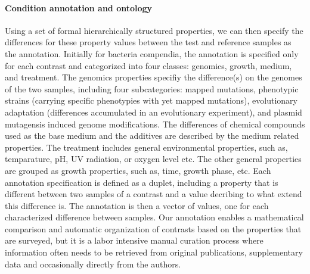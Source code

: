 \paragraph{Condition annotation and ontology}

Using a set of formal hierarchically structured properties, we can then
specify the differences for these property values between the test and
reference samples as the annotation.
%
Initially for bacteria compendia, the annotation is specified only for each
contrast and categorized into four classes: genomics, growth, medium, and
treatment.
%
The genomics properties specifiy the difference(s) on the genomes of the two
samples, including four subcategories: mapped mutations, phenotypic strains
(carrying specific phenotypies with yet mapped mutations), evolutionary
adaptation (differences accumulated in an evolutionary experiment), and plasmid
mutagensis induced genome modifications.
%
The differences of chemical compounds used as the base medium and the additives
are described by the medium related properties.
%
The treatment includes general environmental properties, such as, temparature,
pH, UV radiation, or oxygen level etc.
%
The other general properties are grouped as growth properties, such as, time,
growth phase, etc.
%
Each annotation specification is defined as a duplet, including a property that
is different between two samples of a contrast and a value decribing to what
extend this difference is.
%
The annotation is then a vector of values, one for each characterized
difference between samples.
%
Our annotation enables a mathematical comparison and automatic organization of
contrasts based on the properties that are surveyed, but it is a labor
intensive manual curation process where information often needs to be retrieved
from original publications, supplementary data and occasionally directly from
the authors.


